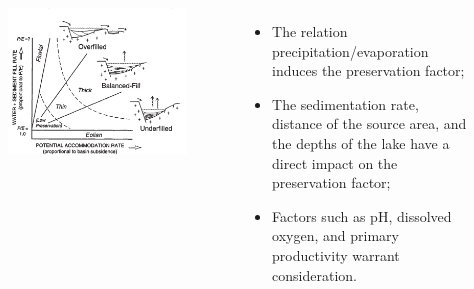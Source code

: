 \documentclass[aspectratio=169]{beamer} %
\begin{document}
{{{{\begin{frame}
\begin{flushright}
\begin{columns}
        \centering
         \begin{figure}
		\centering
		\includegraphics[scale=0.38]{images/relacaoPE.png}
	\end{figure}


        \centering
         \begin{itemize}
          \item The relation precipitation/evaporation induces the preservation factor;     
          \pause
           \item The sedimentation rate, distance of the source area, and the depths of the lake have a direct impact on the preservation factor;
           \pause
          \item Factors such as pH, dissolved oxygen, and primary productivity warrant consideration.
          
     
         \end{itemize}	     	

    \end{columns}

\end{flushright}

\begin{flushright}
\citep{kelts1988,Talbot1988,Goncalves2001,Wright2018,Boyd2015,Neves2019}
\end{flushright}
\end{frame} }



}}}
\end{document}
